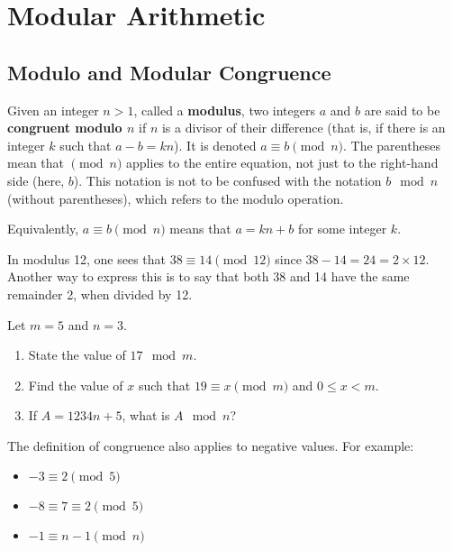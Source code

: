 \chapter{Modular Arithmetic}
\section{Modulo and Modular Congruence}

Given an integer $n>1$, called a \textbf{modulus}, two integers $a$ and $b$ are said to be \textbf{congruent modulo $n$} if $n$ is a divisor of their difference (that is, if there is an integer $k$ such that $a - b = kn$). It is denoted $a \equiv b \pmod{n}$. The parentheses mean that $\pmod{n}$ applies to the entire equation, not just to the right-hand side (here, $b$). This notation is not to be confused with the notation $b \mod n$ (without parentheses), which refers to the modulo operation. \begin{remark}
    Equivalently, $a \equiv b \pmod n$ means that $a = kn + b$ for some integer $k$.
\end{remark}
\begin{example}
    In modulus 12, one sees that $38 \equiv 14 \pmod{12}$ since $38 - 14 = 24 = 2 \times 12$. Another way to express this is to say that both 38 and 14 have the same remainder 2, when divided by 12.
\end{example}
\begin{exercise}
    Let $m = 5$ and $n = 3$.
    \begin{enumerate}[label=(\alph*)]
        \item State the value of $17 \mod m$.
        \item Find the value of $x$ such that $19 \equiv x \pmod m$ and $0 \leq x < m$.
        \item If $A = 1234n + 5$, what is $A \mod n$?
    \end{enumerate}
\end{exercise}

\newpage

The definition of congruence also applies to negative values. For example:
\begin{itemize}
    \item $-3 \equiv 2 \pmod5$
    \item $-8 \equiv 7 \equiv 2 \pmod5$
    \item $-1 \equiv n-1 \pmod{n}$
\end{itemize}

